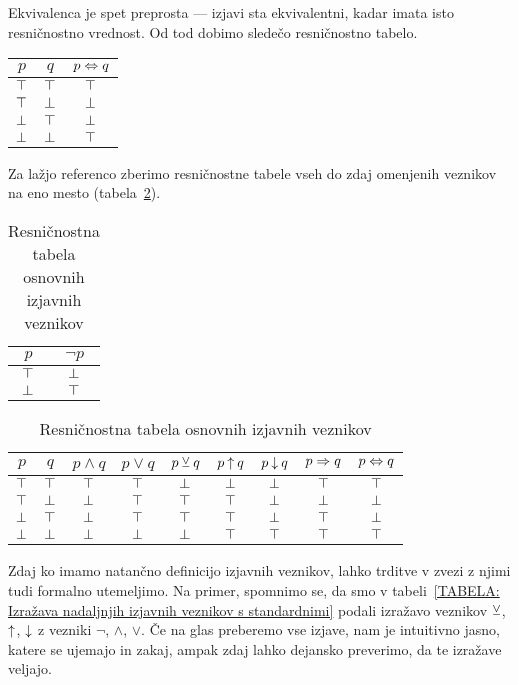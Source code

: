 		Ekvivalenca je spet preprosta --- izjavi sta ekvivalentni, kadar imata isto resničnostno vrednost. Od tod dobimo sledečo resničnostno tabelo.
		\begin{center}
			\begin{tabular}{cc|c}
				$p$ & $q$ & $p \Leftrightarrow q$ \\
				\hline
				$\top$ & $\top$ & $\top$ \\
				$\top$ & $\bot$ & $\bot$ \\
				$\bot$ & $\top$ & $\bot$ \\
				$\bot$ & $\bot$ & $\top$
			\end{tabular}
		\end{center}
		
		Za lažjo referenco zberimo resničnostne tabele vseh do zdaj omenjenih veznikov na eno mesto (tabela~\ref{TABELA: Resničnostna tabela osnovnih izjavnih veznikov}).
		
		\begin{table}[!ht]
			\centering
			\begin{tabular}{c|c}
				$p$ & $\lnot{p}$ \\
				\hline
				$\top$ & $\bot$ \\
				$\bot$ & $\top$
			\end{tabular}
			\qquad\quad
			\begin{tabular}{cc|ccccccc}
				$p$ & $q$ & $p \land q$ & $p \lor q$ & $p \mathbin{\veebar} q$ & $p \mathbin{\uparrow} q$ & $p \mathbin{\downarrow} q$ & $p \Rightarrow q$ & $p \Leftrightarrow q$ \\
				\hline
				$\top$ & $\top$ & $\top$ & $\top$ & $\bot$ & $\bot$ & $\bot$ & $\top$ & $\top$ \\
				$\top$ & $\bot$ & $\bot$ & $\top$ & $\top$ & $\top$ & $\bot$ & $\bot$ & $\bot$ \\
				$\bot$ & $\top$ & $\bot$ & $\top$ & $\top$ & $\top$ & $\bot$ & $\top$ & $\bot$ \\
				$\bot$ & $\bot$ & $\bot$ & $\bot$ & $\bot$ & $\top$ & $\top$ & $\top$ & $\top$
			\end{tabular}
			\caption{Resničnostna tabela osnovnih izjavnih veznikov}\label{TABELA: Resničnostna tabela osnovnih izjavnih veznikov}
		\end{table}
		
		Zdaj ko imamo natančno definicijo izjavnih veznikov, lahko trditve v zvezi z njimi tudi formalno utemeljimo. Na primer, spomnimo se, da smo v tabeli~\ref{TABELA: Izražava nadaljnjih izjavnih veznikov s standardnimi} podali izražavo veznikov $\mathbin{\veebar}$, $\mathbin{\uparrow}$, $\mathbin{\downarrow}$ z vezniki $\lnot$, $\land$, $\lor$. Če na glas preberemo vse izjave, nam je intuitivno jasno, katere se ujemajo in zakaj, ampak zdaj lahko dejansko preverimo, da te izražave veljajo.
		
